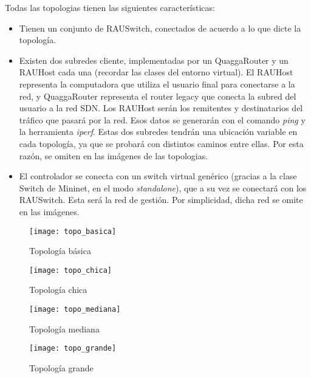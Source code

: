 Todas las topologias tienen las siguientes características:
\begin{itemize}
	\item Tienen un conjunto de RAUSwitch, conectados de acuerdo a lo que dicte la topología.
	\item Existen dos subredes cliente, implementadas por un QuaggaRouter y un RAUHost cada una (recordar las clases del entorno virtual). El RAUHost representa la computadora que utiliza el usuario final para conectarse a la red, y QuaggaRouter representa el router legacy que conecta la subred del usuario a la red SDN. Los RAUHost serán los remitentes y destinatarios del tráfico que pasará por la red. Esos datos se generarán con el comando \textit{ping} y la herramienta \textit{iperf}. Estas dos subredes tendrán una ubicación variable en cada topología, ya que se probará con distintos caminos entre ellas. Por esta razón, se omiten en las imágenes de las topologias.
	\item El controlador se conecta con un switch virtual genérico (gracias a la clase Switch de Mininet, en el modo \textit{standalone}), que a su vez se conectará con los RAUSwitch. Esta será la red de gestión. Por simplicidad, dicha red se omite en las imágenes.
\end{itemize}

\begin{figure}[t]
	\caption{Topología básica}
	\texttt{[image: topo\_basica]}
	\centering
	\label{fig:topo_basica}
\end{figure}

\begin{figure}[t]
	\caption{Topología chica}
	\texttt{[image: topo\_chica]}
	\centering
	\label{fig:topo_chica}
\end{figure}

\begin{figure}[t]
	\caption{Topología mediana}
	\texttt{[image: topo\_mediana]}
	\centering
	\label{fig:topo_mediana}
\end{figure}

\begin{figure}[t]
	\caption{Topología grande}
	\texttt{[image: topo\_grande]}
	\centering
	\label{fig:topo_grande}
\end{figure}

